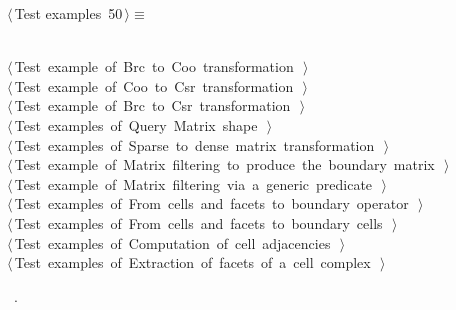 \documentclass[11pt,oneside]{article}    %
\begin{document}
\begin{flushleft} \small \label{scrap82}
\protect{}$\langle\,$Test examples\nobreak\ {\footnotesize 50}$\,\rangle\equiv$
\vspace{-1ex}
\begin{list}{}{} \item
\mbox{}\verb@@\\
\mbox{}\verb@@\hbox{$\langle\,$Test example of Brc to Coo transformation\nobreak\ {\footnotesize {}}$\,\rangle$}\verb@@\\
\mbox{}\verb@@\hbox{$\langle\,$Test example of Coo to Csr transformation\nobreak\ {\footnotesize {}}$\,\rangle$}\verb@@\\
\mbox{}\verb@@\hbox{$\langle\,$Test example of Brc to Csr transformation\nobreak\ {\footnotesize {}}$\,\rangle$}\verb@@\\
\mbox{}\verb@@\hbox{$\langle\,$Test examples of Query Matrix shape\nobreak\ {\footnotesize {}}$\,\rangle$}\verb@@\\
\mbox{}\verb@@\hbox{$\langle\,$Test examples of Sparse to dense matrix transformation\nobreak\ {\footnotesize {}}$\,\rangle$}\verb@@\\
\mbox{}\verb@@\hbox{$\langle\,$Test example of Matrix filtering to produce the boundary matrix\nobreak\ {\footnotesize {}}$\,\rangle$}\verb@@\\
\mbox{}\verb@@\hbox{$\langle\,$Test example of Matrix filtering via a generic predicate\nobreak\ {\footnotesize {}}$\,\rangle$}\verb@@\\
\mbox{}\verb@@\hbox{$\langle\,$Test examples of From cells and facets to boundary operator\nobreak\ {\footnotesize {}}$\,\rangle$}\verb@@\\
\mbox{}\verb@@\hbox{$\langle\,$Test examples of From cells and facets to boundary cells\nobreak\ {\footnotesize {}}$\,\rangle$}\verb@@\\
\mbox{}\verb@@\hbox{$\langle\,$Test examples of Computation of cell adjacencies\nobreak\ {\footnotesize {}}$\,\rangle$}\verb@@\\
\mbox{}\verb@@\hbox{$\langle\,$Test examples of Extraction of facets of a cell complex\nobreak\ {\footnotesize {}}$\,\rangle$}\verb@@\\
\mbox{}\verb@@{\NWsep}
\end{list}
\vspace{-1ex}
\footnotesize\addtolength{\baselineskip}{-1ex}
\begin{list}{}{\setlength{\itemsep}{-\parsep}\setlength{\itemindent}{-\leftmargin}}
\item \NWtxtMacroRefIn\ .
\end{list}
\end{flushleft}
\end{document}
